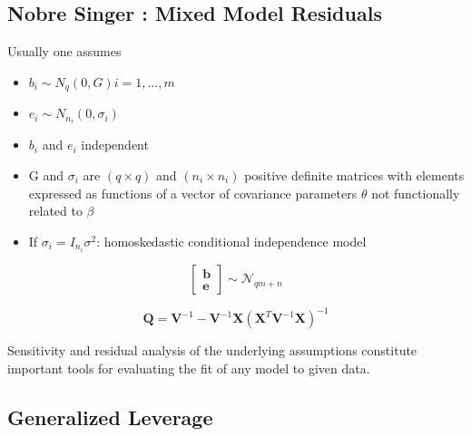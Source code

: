 \documentclass[Main.tex]{subfiles}
\begin{document}
	

\subsection*{Nobre Singer :  Mixed Model Residuals }

Usually one assumes
\begin{itemize}
\item $b_i \sim N_q(0, G) i = 1, ..., m$
\item $e_i  \sim N_{n_i} (0, \sigma_i)$
\item $b_i$ and $e_i$ independent
\item G and $\sigma_i$ are $(q \times q)$ and $(n_i \times n_i)$ positive deﬁnite matrices with
elements expressed as functions of a vector of covariance parameters $\theta$ not functionally related to $\beta$
\item If $\sigma_i = I_{n_i} \sigma^2$: homoskedastic conditional independence model
\end{itemize}

\[  \left[ \begin{array}{c} \boldsymbol{b} \\ \boldsymbol{e} \end{array}\right] \sim \mathcal{N}_{qm+n} \] 


\[ \boldsymbol{Q} = \boldsymbol{V}^{-1} - \boldsymbol{V}^{-1}\boldsymbol{X} ( \boldsymbol{X}^{T} \boldsymbol{V}^{-1} \boldsymbol{X})^{-1} \]


Sensitivity and residual analysis of the underlying assumptions constitute important tools for evaluating the fit of any model to given data.


\subsection*{Generalized Leverage}

\end{document}
